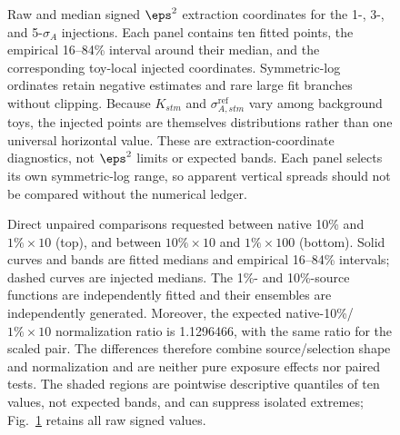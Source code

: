 {\begin{figure}[p]
\centering
{}
\caption{Raw and median signed $\eps^2$ extraction coordinates for the 1-, 3-, and
5-$\sigma_A$ injections.  Each panel contains ten fitted points, the empirical
16--84\% interval around their median, and the corresponding toy-local injected
coordinates.  Symmetric-log ordinates retain negative estimates and rare large
fit branches without clipping.  Because $K_{stm}$ and
$\sigma^{\mathrm{ref}}_{A,stm}$ vary among background toys, the injected points are
themselves distributions rather than one universal horizontal value.  These are
extraction-coordinate diagnostics, not $\eps^2$ limits or expected bands.
Each panel selects its own symmetric-log range, so apparent vertical spreads
should not be compared without the numerical ledger.}
\label{fig:v4p5-eps2-distributions}
\end{figure}

\begin{figure}[p]
\centering
{}
\caption{Direct unpaired comparisons requested between native 10\% and
$1\%\times10$ (top), and between $10\%\times10$ and $1\%\times100$ (bottom).
Solid curves and bands are fitted medians and empirical 16--84\% intervals; dashed
curves are injected medians.  The 1\%- and 10\%-source functions are independently
fitted and their ensembles are independently generated.  Moreover, the expected
native-10\%/$1\%\times10$ normalization ratio is 1.1296466, with the same ratio for
the scaled pair.  The differences therefore combine source/selection shape and
normalization and are neither pure exposure effects nor paired tests.  The shaded
regions are pointwise descriptive quantiles of ten values, not expected bands, and
can suppress isolated extremes; Fig.~\ref{fig:v4p5-eps2-distributions} retains all
raw signed values.}
\label{fig:v4p5-direct-eps2-comparisons}
\end{figure}

}
